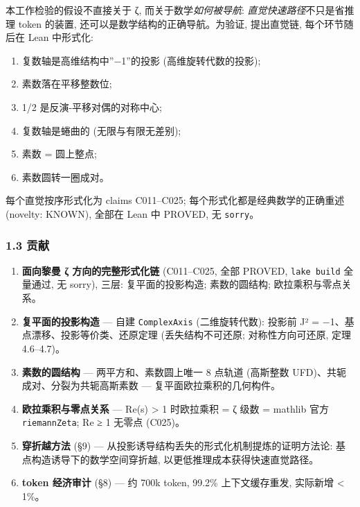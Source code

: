 \documentclass[
]{article}
\providecommand{\tightlist}{%
  \setlength{\itemsep}{0pt}\setlength{\parskip}{0pt}}
\begin{document}
本工作检验的假设不直接关于 ζ, 而关于数学\emph{如何被导航}:
\emph{直觉快速路径}不只是省推理 token 的装置,
还可以是数学结构的正确导航。为验证, 提出直觉链, 每个环节随后在 Lean
中形式化:

\begin{enumerate}
\def\labelenumi{\arabic{enumi}.}
\tightlist
\item
  复数轴是高维结构中''−1''的投影 (高维旋转代数的投影);
\item
  素数落在平移整数位;
\item
  1/2 是反演-平移对偶的对称中心;
\item
  复数轴是蜷曲的 (无限与有限无差别);
\item
  素数 = 圆上整点;
\item
  素数圆转一圈成对。
\end{enumerate}

每个直觉按序形式化为 claims C011--C025; 每个形式化都是经典数学的正确重述
(novelty: KNOWN), 全部在 Lean 中 PROVED, 无 \texttt{sorry}。

\subsubsection{1.3 贡献}\label{ux8d21ux732e}

\begin{enumerate}
\def\labelenumi{\arabic{enumi}.}
\tightlist
\item
  \textbf{面向黎曼 ζ 方向的完整形式化链} (C011--C025, 全部 PROVED,
  \texttt{lake\ build} 全量通过, 无 sorry), 三层: 复平面的投影构造;
  素数的圆结构; 欧拉乘积与零点关系。
\item
  \textbf{复平面的投影构造} --- 自建 \texttt{ComplexAxis}
  (二维旋转代数): 投影前 J² = −1、基点漂移、投影等价类、还原定理
  (丢失结构不可还原; 对称性方向可还原, 定理 4.6--4.7)。
\item
  \textbf{素数的圆结构} --- 两平方和、素数圆上唯一 8 点轨道 (高斯整数
  UFD)、共轭成对、分裂为共轭高斯素数 --- 复平面欧拉乘积的几何构件。
\item
  \textbf{欧拉乘积与零点关系} --- Re(s) \textgreater{} 1 时欧拉乘积 = ζ
  级数 = mathlib 官方 \texttt{riemannZeta}; Re ≥ 1 无零点 (C025)。
\item
  \textbf{穿折越方法} (§9) ---
  从投影诱导结构丢失的形式化机制提炼的证明方法论:
  基点构造诱导下的数学空间穿折越, 以更低推理成本获得快速直觉路径。
\item
  \textbf{token 经济审计} (§8) --- 约 700k token, 99.2\% 上下文缓存重发,
  实际新增 \textless{} 1\%。
\end{enumerate}
\end{document}

